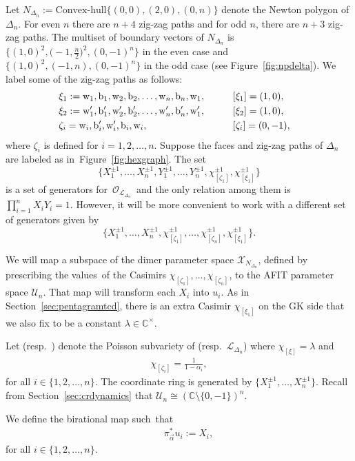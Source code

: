 \documentclass[pdftex]{sigma}
\numberwithin{equation}{section}
\newcommand{\C}{{\mathbb C}}
\newcommand{\ra}{\rightarrow}
\newcommand{\la}{\label}
\newcommand{\w}{{\rm w}}
\newcommand{\bw}{{\rm b}}
\begin{document}
	Let $N_{\Delta_n}:=\text{Convex-hull}\{(0,0), (2,0),(0,n)\}$ denote the Newton polygon of $\Delta_n$. For even $n$ there are $n+4$ zig-zag paths and for odd $n$, there are $n+3$ zig-zag paths. The multiset of boundary vectors of $N_{\Delta_n}$ is $\bigl\{(1,0)^2,\bigl(-1,\frac n2\bigr)^2,(0,-1)^n \bigr\}$ in the even case and $\bigl\{(1,0)^2,(-1,n),(0,-1)^n\bigr\}$ in the odd case (see Figure~\ref{fig:npdelta}). We label some of the zig-zag paths as follows:
	\begin{alignat*}{3}
		&\xi_{1}:= \w_1,\bw_1,\w_2,\bw_2,\dots,\w_{n},\bw_{n},\w_{1},  \qquad&& [\xi_1]=(1,0),&\\
		&\xi_{2}:= \w_1',\bw_1',\w_2',\bw_2',\dots,\w_{n}',\bw_{n}',\w_{1}', \qquad&& [\xi_2]=(1,0),&\\
		&\zeta_{i}= \w_{i}, \bw_{i}', \w_{i}', \bw_{i},\w_{i},    \qquad&& [\zeta_{i}]=(0,-1),&
	\end{alignat*}
	where $\zeta_i$ is defined for $i=1,2,\dots,n$. Suppose the faces and zig-zag paths of $\Delta_n$ are labeled as in~Figure~\ref{fig:hexgraph}. The set
\[
\bigl\{X_1^{\pm 1}, \dots,X_n^{\pm 1},Y_1^{\pm 1}, \dots,Y_n^{\pm 1},\chi_{[\zeta_1]}^{\pm 1},\chi_{[\xi_1]}^{\pm 1} \bigr\}
\]
 is a set of generators for~$\mathcal O_{{\mathcal L}_{\Delta_n}}$~and the only relation among them is $\prod_{i=1}^n X_i Y_i=1$. However, it will be more convenient to work with a different set of generators given by \[
 \bigl\{X_1^{\pm 1}, \dots,X_n^{\pm 1},\chi_{[\zeta_1]}^{\pm 1},\dots,\chi_{[\zeta_n]}^{\pm 1},\chi_{[\xi_1]}^{\pm 1}\bigr\}.
 \]
	
We will map a subspace of the dimer parameter space $\mathcal X_{N_{\Delta_n}}$, defined by prescribing the values~of the Casimirs $\chi_{[\zeta_1]},\dots,\chi_{[\zeta_n]}$, to the AFIT parameter space $\mathcal U_n$. That map will transform each $X_i$ into $u_i$. As in Section~\ref{sec:pentagramtcd}, there is an extra Casimir $\chi_{[\xi_1]}$ on the GK side that we also fix to be a constant $\lambda \in \C^\times$.
	
	
	Let  \big(resp.\ \big) denote the Poisson subvariety of  (resp.\ $\mathcal L_{\Delta_n}$) where $\chi_{[\xi]}=\lambda$ and
	\begin{align}
		\chi_{[\zeta_{i}]}= \frac{1}{1-\alpha_{i}}, \label{eq:chidelta}
	\end{align}
	for all $i \in \{1,2,\dots,n\}$. The coordinate ring  is generated by $\bigl\{X_1^{\pm 1}, \dots,X_n^{\pm 1}\bigr\}$. Recall from Section~\ref{sec:crdynamics} that $\mathcal U_n\cong (\C \setminus \{0,-1\})^n$.
	\begin{Definition}\label{def7.1}
		We define the birational map \smash{$\pi_{\vec \alpha} \colon \mathcal X_{N_{\Delta_n},\vec \alpha}^\lambda \supset \mathcal L_{{\Delta_n},\vec \alpha}^\lambda \!\ra\! (\C \setminus \{0,-1\})^n$} such~that
		\begin{align}\la{def:i}
			\qquad \pi_{\vec \alpha}^*u_i := X_i,
		\end{align}
		for all $i \in \{1,2,\dots,n\}$.
	\end{Definition}
\end{document}
